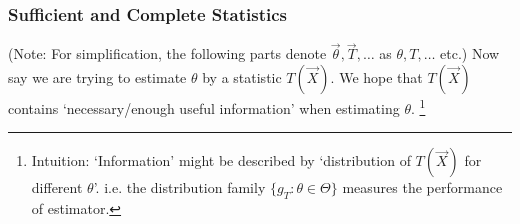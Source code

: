     




\subsubsection{Sufficient and Complete Statistics}\label{SubSectionSufficient_CompleteStatistics}
    (Note: For simplification, the following parts denote $\vec{\theta},\vec{T},\ldots$  as $\theta,T,\ldots$ etc.) Now say we are trying to estimate $ \theta  $ by a statistic $ T(\vec{X}) $. We hope that $ T(\vec{X}) $ contains `necessary/enough useful information' when estimating $ \theta  $. \footnote{Intuition: `Information' might be described by `distribution of $ T(\vec{X}) $ for different $ \theta  $'. i.e. the distribution family $ \{g_T:\theta \in\Theta \} $ measures the performance of estimator.}

